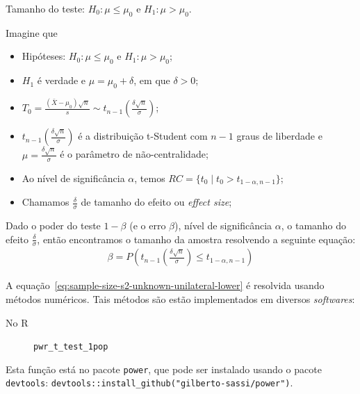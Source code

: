 \documentclass[8pt]{beamer}
\begin{document}
\begin{frame}{Tamanho do teste: $H_0:\mu \leq \mu_0$ e $H_1: \mu > \mu_0$.}

\small

Imagine que
\begin{itemize}
\item Hipóteses: $H_0: \mu \leq \mu_0$ e $H_1: \mu > \mu_0$;
\item $H_1$ é verdade e $\mu = \mu_0 + \delta$, em que $\delta > 0$;
\item $T_0 = \frac{(\bar{X} - \mu_0)\sqrt{n}}{s}  \sim t_{n-1}\left( \frac{\delta \sqrt{n}}{\sigma} \right)$;
\item $t_{n-1}\left(\frac{\delta\sqrt{n}}{\sigma}\right)$ é a distribuição t-Student com $n-1$ graus de liberdade e $\mu=\frac{\delta \sqrt{n}}{\sigma}$ é o parâmetro de não-centralidade;
\item Ao nível de significância $\alpha$, temos $RC = \{ t_0 \mid t_0 > t_{1-\alpha, n-1}   \}$;
\item Chamamos $\frac{\delta}{\sigma}$ de tamanho do efeito ou \textit{effect size};
\end{itemize}
\vfill

Dado o poder do teste $1-\beta$ (e o erro $\beta$), nível de significância $\alpha$, o tamanho do efeito $\frac{\delta}{\sigma}$, então encontramos o tamanho da amostra resolvendo a seguinte equação:
\begin{align}\label{eq:sample-size-s2-unknown-unilateral-lower}
\beta = P\left( t_{n-1}\left( \frac{\delta\sqrt{n}}{\sigma}\right) \leq t_{1-\alpha, n-1}  \right)
\end{align}

A equação~\eqref{eq:sample-size-s2-unknown-unilateral-lower} é resolvida usando métodos numéricos. Tais métodos são estão implementados em diversos \textit{softwares}:
\begin{description}
\item[No R] \lstinline|pwr_t_test_1pop|
\end{description}

Esta função está no pacote \lstinline|power|, que pode ser instalado usando o pacote \lstinline|devtools|: \lstinline|devtools::install_github("gilberto-sassi/power")|.

\normalsize

\end{frame}
\end{document}
